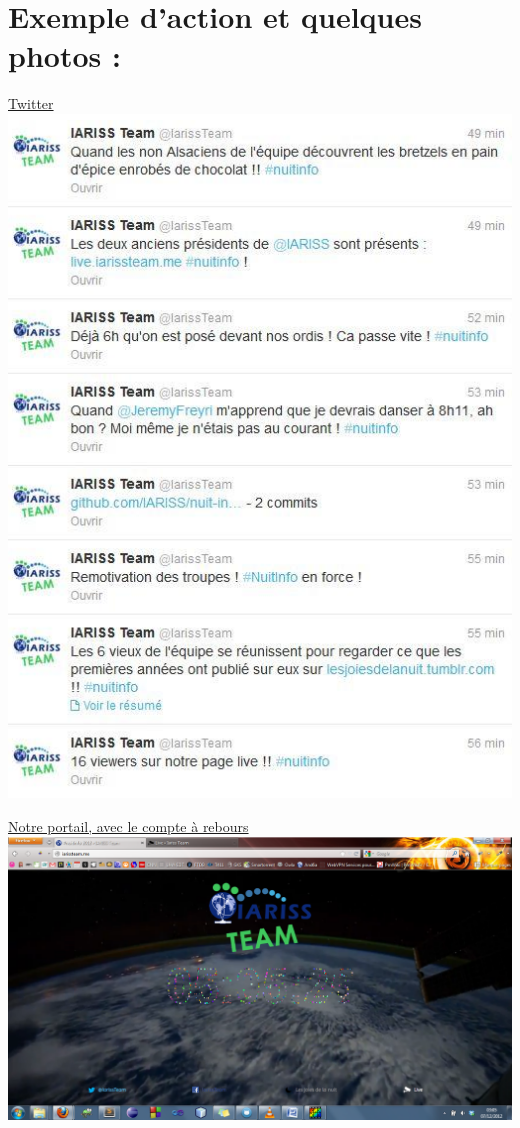 \documentclass[12pt, a4paper]{article}
\newcommand{\espace}{\vspace{.8cm}}
\begin{document}
\espace{}
\section{Exemple d'action et quelques photos : }
\href{https://twitter.com/}{Twitter}
\espace{}
\includegraphics[width=.9\textwidth, keepaspectratio=true]{img/twitter.png}
\espace{}

\href{http://iarissteam.me/}{Notre portail, avec le compte à rebours}
\espace{}
\includegraphics[width=.9\textwidth, keepaspectratio=true]{img/portail.png}
\espace{}
\end{document}

